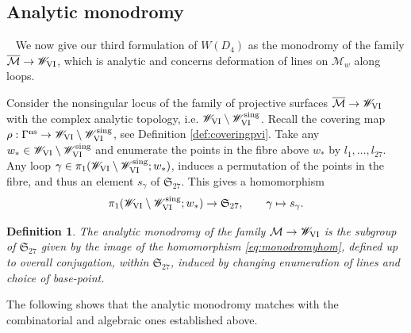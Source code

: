 \documentclass[a4paper,reqno]{amsart}
\numberwithin{equation}{section}
\newtheorem{definition}[theorem]{Definition}
\numberwithin{equation}{section}
\begin{document}
\subsection{Analytic monodromy} \label{subsec:analyticmonodromyPVI}
~
We now give our third formulation of $W(D_4)$ as the monodromy of the family $\overline{\mathcal{M}}\to \mathscr{W}_{\rm{VI}}$, which is analytic and concerns deformation of lines on $\mathcal{M}_w$ along loops.


Consider the nonsingular locus of the family of projective surfaces $\overline{\mathcal{M}}\to\mathscr{W}_{\rm{VI}}$ with the complex analytic topology, i.e.
$\mathscr{W}_{\rm{VI}}\setminus \mathscr{W}_{\rm{VI}}^{\operatorname{sing}}$. Recall the covering map $\rho : \Gamma^{\operatorname{ns}} \to \mathscr{W}_{\rm{VI}}\setminus\mathscr{W}_{\rm{VI}}^{\operatorname{sing}}$, see Definition \ref{def:coveringpvi}. Take any $w_{*}\in \mathscr{W}_{\rm{VI}}\setminus \mathscr{W}_{\rm{VI}}^{\operatorname{sing}}$ and enumerate the points in the fibre above $w_{*}$ by $l_1,\ldots,l_{27}$. Any loop $\gamma\in \pi_1( \mathscr{W}_{\rm{VI}}\setminus \mathscr{W}_{\rm{VI}}^{\operatorname{sing}} ; w_{*})$,  induces a permutation of the points in the fibre, and thus an element $s_\gamma$ of $\mathfrak{S}_{27}$. This gives a homomorphism
\begin{equation}\label{eq:monodromyhom}
    \pi_1( \mathscr{W}_{\rm{VI}}\setminus \mathscr{W}_{\rm{VI}}^{\operatorname{sing}} ; w_{*})\rightarrow \mathfrak{S}_{27}, \qquad \gamma\mapsto s_\gamma.
\end{equation}
\begin{definition}
    The \emph{analytic monodromy} of the family $\mathcal{M}\to \mathscr{W}_{\rm{VI}}$ is the subgroup of $\mathfrak{S}_{27}$ given by the image of the homomorphism \eqref{eq:monodromyhom},
    defined up to overall conjugation, within $\mathfrak{S}_{27}$, induced by changing enumeration of lines and choice of base-point.
\end{definition}





The following shows that the analytic monodromy matches with the combinatorial and algebraic ones established above.
\end{document}
